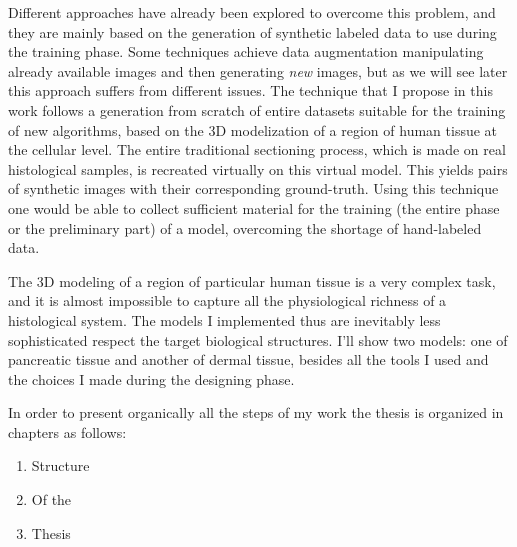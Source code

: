 Different approaches have already been explored to overcome this problem, and they are mainly based on the generation of synthetic labeled data to use during the training phase. Some techniques achieve data augmentation manipulating already available images and then generating \textit{new} images, but as we will see later this approach suffers from different issues. The technique that I propose in this work follows a generation from scratch of entire datasets suitable for the training of new algorithms, based on the 3D modelization of a region of human tissue at the cellular level. The entire traditional sectioning process, which is made on real histological samples, is recreated virtually on this virtual model. This yields pairs of synthetic images with their corresponding ground-truth. Using this technique one would be able to collect sufficient material for the training (the entire phase or the preliminary part) of a model, overcoming the shortage of hand-labeled data.

The 3D modeling of a region of particular human tissue is a very complex task, and it is almost impossible to capture all the physiological richness of a histological system. The models I implemented thus are inevitably less sophisticated respect the target biological structures. I'll show two models: one of pancreatic tissue and another of dermal tissue, besides all the tools I used and the choices I made during the designing phase.

In order to present organically all the steps of my work the thesis is organized in chapters as follows:

\begin{enumerate}
    \item Structure

    \item Of the

    \item Thesis
\end{enumerate}


